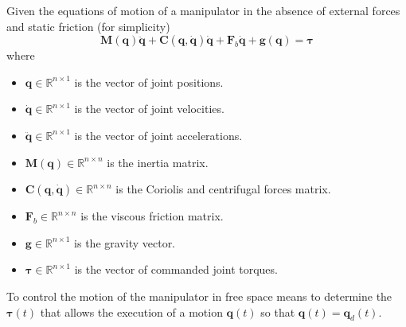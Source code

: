 \documentclass[10pt, aspectratio=169]{beamer}
\theoremstyle{remark}
\theoremstyle{definition}
\begin{document}
\begin{frame}[allowframebreaks]
    Given the equations of motion of a manipulator in the absence of external forces and static friction (for simplicity)
    \begin{equation}
        \mathbf{M}(\mathbf{q}) \ddot{\mathbf{q}} + \mathbf{C}(\mathbf{q}, \dot{\mathbf{q}}) \dot{\mathbf{q}} +  \mathbf{F}_b \dot{\mathbf{q}} + \mathbf{g}(\mathbf{q}) = \boldsymbol{\tau}
        \label{eq:dynamic_model}
    \end{equation}
    where
    \begin{itemize}
        \item $\mathbf{q} \in \mathbb{R}^{n \times 1}$ is the vector of joint positions.
        \item $\dot{\mathbf{q}} \in \mathbb{R}^{n \times 1}$ is the vector of joint velocities.
        \item $\ddot{\mathbf{q}} \in \mathbb{R}^{n \times 1}$ is the vector of joint accelerations.
        \item $\mathbf{M}(\mathbf{q}) \in \mathbb{R}^{n \times n}$ is the inertia matrix.
        \item $\mathbf{C}(\mathbf{q}, \dot{\mathbf{q}}) \in \mathbb{R}^{n \times n}$ is the Coriolis and centrifugal forces matrix.
        \item $\mathbf{F}_b \in \mathbb{R}^{n \times n}$ is the viscous friction matrix.
        \item $\mathbf{g} \in \mathbb{R}^{n \times 1}$ is the gravity vector.
        \item $\boldsymbol{\tau} \in \mathbb{R}^{n \times 1}$ is the vector of commanded joint torques.
    \end{itemize}

    \framebreak

    To \textcolor{uma_blue_light}{control the motion of the manipulator in free space} means to determine the $\boldsymbol{\tau}(t)$ that allows the execution of a motion $\mathbf{q}(t)$ so that $\mathbf{q}(t) = \mathbf{q}_d(t)$.
    

\end{frame}
\end{document}
